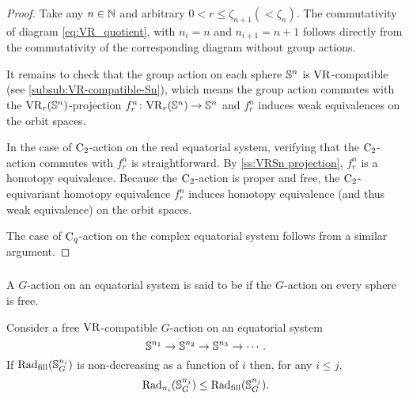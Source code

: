 \begin{proof}
    Take any $n \in \mathbb{N}$ and arbitrary $0 < r \leq \zeta_{n+1} (< \zeta_{n})$.
    The commutativity of diagram \ref{eq:VR_quotient}, with $n_i = n$ and $n_{i+1} = n+1$ follows directly from the commutativity of the corresponding diagram without group actions.

    It remains to check that the group action on each sphere $\mathbb{S}^n$ is \(\mathrm{VR}\)-compatible (see \cref{subsub:VR-compatible-Sn}), which means the group action commutes with the $\mathrm{VR}_r(\mathbb{S}^{n})$-projection $f_r^{n}\colon \mathrm{VR}_r(\mathbb{S}^{n}) \to \mathbb{S}^{n}$ and $f_r^{n}$ induces weak equivalences on the orbit spaces.

    In the case of $\mathrm{C}_2$-action on the real equatorial system, verifying that the $\mathrm{C}_2$-action commutes with $f_r^{n}$ is straightforward.
    By \cref{ss:VRSn projection}, $f_r^{n}$ is a homotopy equivalence.
    Because the $\mathrm{C}_2$-action is proper and free, the $\mathrm{C}_2$-equivariant homotopy equivalence $f_r^n$ induces homotopy equivalence (and thus weak equivalence) on the orbit spaces.

    The case of $\mathrm{C}_q$-action on the complex equatorial system follows from a similar argument.
\end{proof}

\subsubsection{}\label{ss:fundamental_lemma}

A \(G\)-action on an equatorial system is said to be  if the \(G\)-action on every sphere is free.

\medskip\lemma Consider a free $\mathrm{VR}$-compatible $G$-action on an equatorial system
\[
\mathbb{S}^{n_1} \to \mathbb{S}^{n_2} \to \mathbb{S}^{n_3} \to \dotsb.
\]
If $\mathrm{Rad}_{\mathrm{fill}}(\mathbb{S}^{n_i}_G)$ is non-decreasing as a function of \(i\) then, for any \(i \leq j\),
\[
\mathrm{Rad}_{n_i}(\mathbb{S}^{n_j}_G) \leq \mathrm{Rad}_{\mathrm{fill}}(\mathbb{S}^{n_j}_G).
\]

